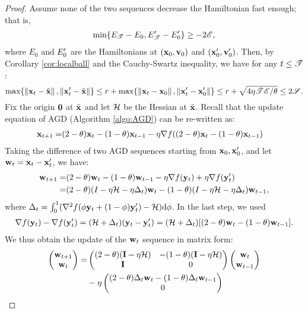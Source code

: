 \begin{proof}
Assume none of the two sequences decrease the Hamiltonian fast enough; that is,
\begin{align*}
\min\{E_{\mathscr{T}} -E_0, E '_{\mathscr{T}} - E '_0\} \ge - 2\mathscr{E},
\end{align*}
where $E_0$ and $E '_0$ are the Hamiltonians at $(\mathbf{x}_0, \mathbf{v}_0)$ and $(\mathbf{x} '_0, \mathbf{v} '_0)$.
Then, by Corollary \ref{cor:localball} and the Cauchy-Swartz inequality, we have
for any $t \le \mathscr{T}$:
\begin{equation*}
\max\{\left\|{\mathbf{x}_t - \tilde{\mathbf{x}}}\right\|,  \left\|{\mathbf{x} '_t - \tilde{\mathbf{x}}}\right\|\} \le 
r + \max\{\left\|{\mathbf{x}_t - \mathbf{x}_0}\right\|,  \left\|{\mathbf{x} '_t - \mathbf{x} '_0}\right\|\}
\le r + \sqrt{4\eta \mathscr{T} \mathscr{E}/\theta} \le 2\mathscr{S}.
\end{equation*}
Fix the origin $\mathbf{0}$ at $\tilde{\mathbf{x}}$ and let $\mathcal{H}$ be the Hessian at $\tilde{\mathbf{x}}$. Recall that the update equation of AGD (Algorithm \ref{algo:AGD}) can be re-written as:
\begin{align*}
\mathbf{x}_{t+1}  =& (2-\theta) \mathbf{x}_{t} - (1-\theta)  \mathbf{x}_{t-1}
 -\eta \nabla f((2-\theta) \mathbf{x}_{t} - (1-\theta)  \mathbf{x}_{t-1}) 
\end{align*}
Taking the difference of two AGD sequences starting from $\mathbf{x}_0,  \mathbf{x} '_0$, and let $\mathbf{w}_t = \mathbf{x}_t - \mathbf{x} '_t$, we have:
\begin{align*}
\mathbf{w}_{t+1} =& (2-\theta) \mathbf{w}_{t} - (1-\theta)  \mathbf{w}_{t-1}
-\eta \nabla f( \mathbf{y}_{t}) 
+ \eta \nabla f(\mathbf{y} '_{t})\\ 
=& (2-\theta)(I - \eta\mathcal{H} - \eta\Delta_t) \mathbf{w}_{t} - (1-\theta)(I - \eta\mathcal{H}  -\eta\Delta_t) \mathbf{w}_{t-1},
\end{align*}
where $\Delta_t = \int_{0}^1 (\nabla^2 f(\phi\mathbf{y}_{t} + (1-\phi)\mathbf{y} '_{t}) - \mathcal{H}) \mathrm{d}\phi$. In the last step, we used 
\begin{align*}
\nabla f( \mathbf{y}_{t}) - \nabla f(\mathbf{y} '_{t})
= (\mathcal{H} + \Delta_t)(\mathbf{y}_{t} - \mathbf{y} '_{t})
= (\mathcal{H} + \Delta_t)[(2-\theta) \mathbf{w}_{t} - (1-\theta)  \mathbf{w}_{t-1}].
\end{align*}
We thus obtain the update of the $\mathbf{w}_t$ sequence in matrix form:
\begin{align}
\pmat{\w_{t+1} \\ \w_t}=& \pmat{(2-\theta) (\I - \eta \H)&  -(1-\theta) (\I - \eta \H) \\\I& 0}
\pmat{\w_{t} \\ \w_{t-1}} \nn \\
&- \eta\pmat{(2-\theta) \Delta_t \w_t - (1 - \theta) \Delta_{t} \w_{t-1} \\ 0} \nn \\

\end{align}
\end{proof}
